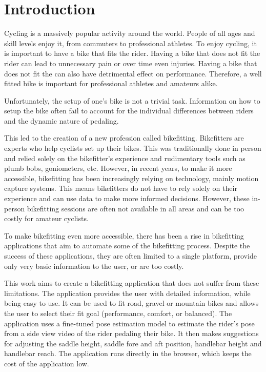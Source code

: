 
% 

\chapter{Introduction}
Cycling is a massively popular activity around the world. People of all ages and skill levels enjoy it, from commuters to professional athletes. To enjoy cycling, it is important to have a bike that fits the rider. Having a bike that does not fit the rider can lead to unnecessary pain or over time even injuries. Having a bike that does not fit the can also have detrimental effect on performance. Therefore, a well fitted bike is important for professional athletes and amateurs alike.

Unfortunately, the setup of one's bike is not a trivial task. Information on how to setup the bike often fail to account for the individual differences between riders and the dynamic nature of pedaling.

This led to the creation of a new profession called bikefitting. Bikefitters are experts who help cyclists set up their bikes. This was traditionally done in person and relied solely on the bikefitter's experience and rudimentary tools such as plumb bobs, goniometers, etc. However, in recent years, to make it more accessible, bikefitting has been increasingly relying on technology, mainly motion capture systems. This means bikefitters do not have to rely solely on their experience and can use data to make more informed decisions. However, these in-person bikefitting sessions are often not available in all areas and can be too costly for amateur cyclists.

To make bikefitting even more accessible, there has been a rise in bikefitting applications that aim to automate some of the bikefitting process. Despite the success of these applications, they are often limited to a single platform, provide only very basic information to the user, or are too costly.

This work aims to create a bikefitting application that does not suffer from these limitations. The application provides the user with detailed information, while being easy to use. It can be used to fit road, gravel or mountain bikes and allows the user to select their fit goal (performance, comfort, or balanced). The application uses a fine-tuned pose estimation model to estimate the rider's pose from a side view video of the rider pedaling their bike. It then makes suggestions for adjusting the saddle height, saddle fore and aft position, handlebar height and handlebar reach. The application runs directly in the browser, which keeps the cost of the application low.

